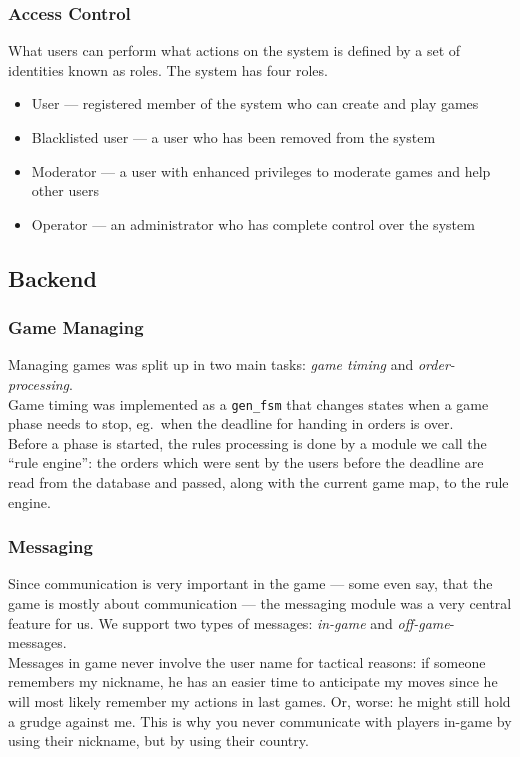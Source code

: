\documentclass[11pt,a4paper]{report}
\begin{document}
\subsubsection{Access Control}
What users can perform what actions on the system is defined by a set of identities known as roles. The system has four roles.

\begin{itemize}
\item User --- registered member of the system who can create and play games
\item Blacklisted user --- a user who has been removed from the system
\item Moderator --- a user with enhanced privileges to moderate games and help other users
\item Operator --- an administrator who has complete control over the system

\end{itemize}

\subsection{Backend}
\subsubsection{Game Managing}
Managing games was split up in two main tasks: {\em game timing\/} and
{\em order-processing}. \\
Game timing was implemented as a {\tt gen\_fsm} that changes states when a game
phase needs to stop, eg.\ when the deadline for handing in orders is over.\\
Before a phase is started, the rules processing is done by a module we call
the ``rule engine'': the orders which were sent by the users before the deadline
are read from the database and passed, along with the current game map, to the
rule engine.
\subsubsection{Messaging}
Since communication is very important in the game --- some even say, that the
game is mostly about communication --- the messaging module was a very central
feature for us. We support two types of messages: {\em in-game\/} and
{\em off-game\/}-messages.\\
Messages in game never involve the user name for
tactical reasons: if someone remembers my nickname, he has an easier time to
anticipate my moves since he will most likely remember my actions in last games.
Or, worse: he might still hold a grudge against me. This is why you never
communicate with players in-game by using their nickname, but by using their
country.
\end{document}
